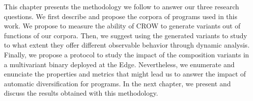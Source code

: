 This chapter presents the methodology we follow to answer our three research questions. We first describe and propose the corpora of programs used in this work. We propose to measure the ability of CROW to generate variants out of  functions of our corpora. Then, we suggest using the generated variants to study to what extent they offer different observable behavior through  dynamic analysis. Finally, we propose a protocol to study the impact of the composition variants in a multivariant binary deployed at the Edge. Nevertheless, we enumerate and enunciate the properties and metrics that might lead us to answer the impact of automatic diversification for \wasm programs. In the next chapter, we present and discuss the results obtained with this methodology.